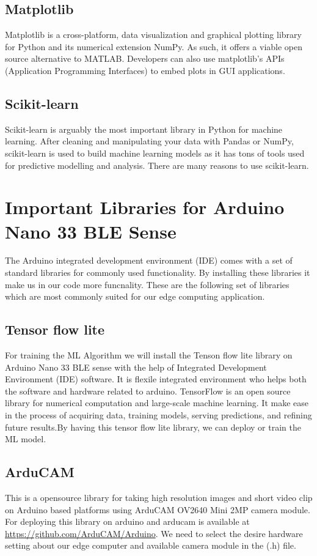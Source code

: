 \subsection{Matplotlib}
Matplotlib is a cross-platform, data visualization and graphical plotting library for Python and its numerical extension NumPy. As such, it offers a viable open source alternative to MATLAB. Developers can also use matplotlib's APIs (Application Programming Interfaces) to embed plots in GUI applications.
\subsection{Scikit-learn}
Scikit-learn is arguably the most important library in Python for machine learning. After cleaning and manipulating your data with Pandas or NumPy, scikit-learn is used to build machine learning models as it has tons of tools used for predictive modelling and analysis. There are many reasons to use scikit-learn.
\section{Important Libraries for Arduino Nano 33 BLE Sense}
The Arduino integrated development environment (IDE) comes with a set of standard libraries for commonly used functionality. By installing these libraries it make us in our code more funcnality. These are the following set of libraries which are most commonly suited for our edge computing application.\\
\subsection{Tensor flow lite}
For training the ML Algorithm we will install the Tenson flow lite library on Arduino Nano 33 BLE sense with the help of Integrated Development Environment (IDE) software. It is flexile integrated environment who helps both the software and hardware related to arduino. TensorFlow is an open source library for numerical computation and large-scale machine learning. It make ease in the process of acquiring data, training models, serving predictions, and refining future results.By having this tensor flow lite library, we can deploy or train the ML model. \\
\subsection{ArduCAM}
This is a opensource library for taking high resolution images and short video clip on Arduino based platforms using ArduCAM OV2640 Mini 2MP camera module. For deploying this library on arduino and arducam is available at \url{https://github.com/ArduCAM/Arduino}. We need to select the desire hardware setting about our edge computer and available camera module in the (.h) file.
